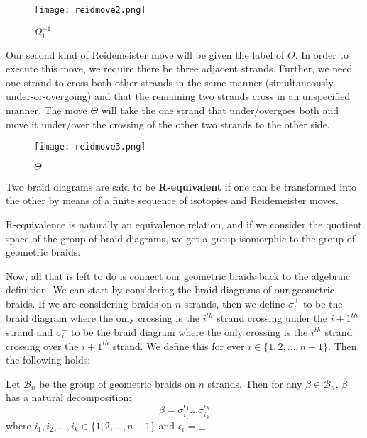 \begin{figure}[H]
	\centering
	\texttt{[image: reidmove2.png]}
	\caption{$\Omega_1^{-1}$}
\end{figure}

Our second kind of Reidemeister move will be given the label of $\Theta$. In order to execute this move, we require there be three adjacent strands. Further, we need one strand to cross both other strands in the same manner (simultaneously under-or-overgoing) and that the remaining two strands cross in an unspecified manner. The move $\Theta$ will take the one strand that under/overgoes both and move it under/over the crossing of the other two strands to the other side. 

\begin{figure}[H]
	\centering
	\texttt{[image: reidmove3.png]}
	\caption{$\Theta$}
\end{figure}

\begin{definition}
	Two braid diagrams are said to be \textbf{R-equivalent} if one can be transformed into the other by means of a finite sequence of isotopies and Reidemeister moves.
\end{definition}

R-equivalence is naturally an equivalence relation, and if we consider the quotient space of the group of braid diagrams, we get a group isomorphic to the group of geometric braids.

Now, all that is left to do is connect our geometric braids back to the algebraic definition. We can start by considering the braid diagrams of our geometric braids. If we are considering braids on $n$ strands, then we define $\sigma_i^+$ to be the braid diagram where the only crossing is the $i^{th}$ strand crossing under the $i+1^{th}$ strand and $\sigma_i^-$ to be the braid diagram where the only crossing is the $i^{th}$ strand crossing over the $i+1^{th}$ strand. We define this for ever $i\in\{1,2,\hdots,n-1\}$. Then the following holds:

\begin{theorem}
	Let $\mathcal{B}_n$ be the group of geometric braids on $n$ strands. Then for any $\beta\in\mathcal{B}_n$, $\beta$ has a natural decomposition:
$$\beta = \sigma^{\epsilon_1}_{i_1}\hdots\sigma^{\epsilon_k}_{i_k}$$ 
where $i_1,i_2,\hdots,i_k\in\{1,2,\hdots,n-1\}$ and $\epsilon_i = \pm$
\end{theorem}

